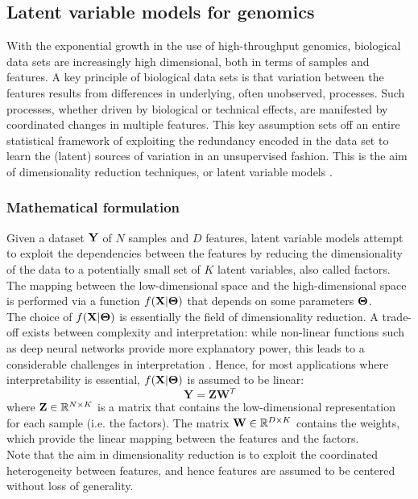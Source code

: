 
\subsection{Latent variable models for genomics}

With the exponential growth in the use of high-throughput genomics, biological data sets are increasingly high dimensional, both in terms of samples and features. A key principle of biological data sets is that variation between the features results from differences in underlying, often unobserved, processes. Such processes, whether driven by biological or technical effects, are manifested by coordinated changes in multiple features. This key assumption sets off an entire statistical framework of exploiting the redundancy encoded in the data set to learn the (latent) sources of variation in an unsupervised fashion. This is the aim of dimensionality reduction techniques, or latent variable models \cite{Komili2008, Stegle2012, Leek2007, Pournara2007, Dai2017, Genevieve2018, Meng2016}.


\subsubsection{Mathematical formulation}

Given a dataset ${\bf Y}$ of $N$ samples and $D$ features, latent variable models attempt to exploit the dependencies between the features by reducing the dimensionality of the data to a potentially small set of $K$ latent variables, also called factors. The mapping between the low-dimensional space and the high-dimensional space is performed via a function $f({\bf X}|\mbox{\boldmath $\Theta$})$ that depends on some parameters $\mbox{\boldmath $\Theta$}$.\\
The choice of $f({\bf X}|\mbox{\boldmath $\Theta$})$ is essentially the field of dimensionality reduction. A trade-off exists between complexity and interpretation: while non-linear functions such as deep neural networks provide more explanatory power, this leads to a considerable challenges in interpretation \cite{Zhang2018_NN}. Hence, for most applications where interpretability is essential, $f({\bf X}|\mbox{\boldmath $\Theta$})$ is assumed to be linear:
\begin{equation} \label{eq:linear_model}
	\mathbf{Y} = \mathbf{Z}\mathbf{W}^{T}
\end{equation}
where ${\bf Z} \in \mathbb{R}^{N \times K}$ is a matrix that contains the low-dimensional representation for each sample (i.e. the factors). The matrix ${\bf W} \in \mathbb{R}^{D \times K}$ contains the weights, which provide the linear mapping between the features and the factors.\\
Note that the aim in dimensionality reduction is to exploit the coordinated heterogeneity between features, and hence features are assumed to be centered without loss of generality.


